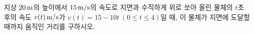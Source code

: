 지상 $20\mkern3mu \mathrm{m}$의 높이에서 $15\mkern3mu \mathrm{m/s}$의 속도로 지면과 수직하게 위로 쏘아 올린 물체의 $t$초 후의 속도 $v(t)\mkern3mu \mathrm{m/s}$가 $v(t)=15-10t\ (0\le t\le 4)$일 때, 이 물체가 지면에 도달할 때까지 움직인 거리를 구하시오.
